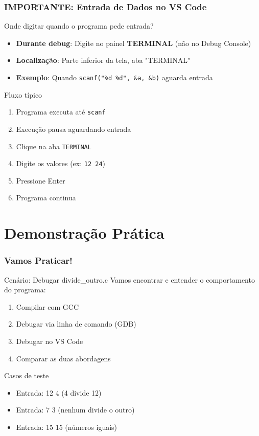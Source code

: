 \documentclass[aspectratio=169]{beamer}
\begin{document}
\begin{frame}[fragile]
\frametitle{IMPORTANTE: Entrada de Dados no VS Code}
\begin{alertblock}{Onde digitar quando o programa pede entrada?}
\begin{itemize}
    \item \textbf{Durante debug}: Digite no painel \textbf{TERMINAL} (não no Debug Console)
    \item \textbf{Localização}: Parte inferior da tela, aba "TERMINAL"
    \item \textbf{Exemplo}: Quando \texttt{scanf("\%d \%d", \&a, \&b)} aguarda entrada
\end{itemize}
\end{alertblock}

\begin{block}{Fluxo típico}
\begin{enumerate}
    \item Programa executa até \texttt{scanf}
    \item Execução pausa aguardando entrada
    \item Clique na aba \texttt{TERMINAL}
    \item Digite os valores (ex: \texttt{12 24})
    \item Pressione Enter
    \item Programa continua
\end{enumerate}
\end{block}
\end{frame}

\section{Demonstração Prática}

\begin{frame}
\frametitle{Vamos Praticar!}
\begin{block}{Cenário: Debugar divide\_outro.c}
Vamos encontrar e entender o comportamento do programa:
\begin{enumerate}
    \item Compilar com GCC
    \item Debugar via linha de comando (GDB)
    \item Debugar no VS Code
    \item Comparar as duas abordagens
\end{enumerate}
\end{block}

\begin{block}{Casos de teste}
\begin{itemize}
    \item Entrada: 12 4 (4 divide 12)
    \item Entrada: 7 3 (nenhum divide o outro)
    \item Entrada: 15 15 (números iguais)
\end{itemize}
\end{block}
\end{frame}
\end{document}
